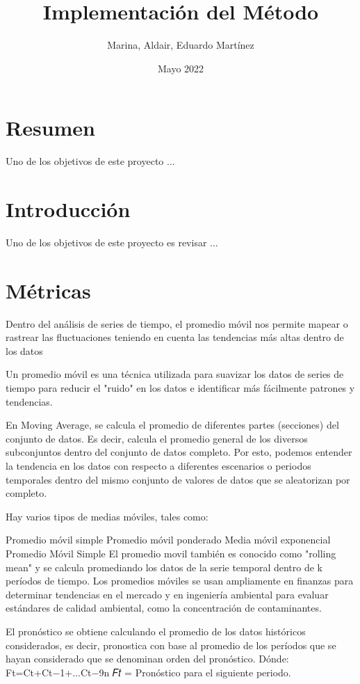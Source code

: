 \documentclass[11pt]{article}
\title{Implementación del Método }
\author{Marina, Aldair, Eduardo Martínez}
\date{Mayo 2022}
\begin{document}
\maketitle

\section{Resumen}

Uno de los objetivos de este proyecto ...


\section{Introducción}

Uno de los objetivos de este proyecto es revisar ...

\section{Métricas}

Dentro del análisis de series de tiempo, el promedio móvil nos permite mapear o rastrear las fluctuaciones teniendo en cuenta las tendencias más altas dentro de los datos

Un promedio móvil es una técnica utilizada para suavizar los datos de series de tiempo para reducir el "ruido" en los datos e identificar más fácilmente patrones y tendencias.

En Moving Average, se calcula el promedio de diferentes partes (secciones) del conjunto de datos. Es decir, calcula el promedio general de los diversos subconjuntos dentro del conjunto de datos completo. Por esto, podemos entender la tendencia en los datos con respecto a diferentes escenarios o periodos temporales dentro del mismo conjunto de valores de datos que se aleatorizan por completo.

Hay varios tipos de medias móviles, tales como:

Promedio móvil simple
Promedio móvil ponderado
Media móvil exponencial
Promedio Móvil Simple
El promedio movil también es conocido como "rolling mean" y se calcula promediando los datos de la serie temporal dentro de k períodos de tiempo. Los promedios móviles se usan ampliamente en finanzas para determinar tendencias en el mercado y en ingeniería ambiental para evaluar estándares de calidad ambiental, como la concentración de contaminantes.

El pronóstico se obtiene calculando el promedio de los datos históricos considerados, es decir, pronostica con base al promedio de los períodos que se hayan considerado que se denominan orden del pronóstico. Dónde:
Ft=Ct+Ct−1+...Ct−9n 
𝐹𝑡 = Pronóstico para el siguiente periodo.
\end{document}
